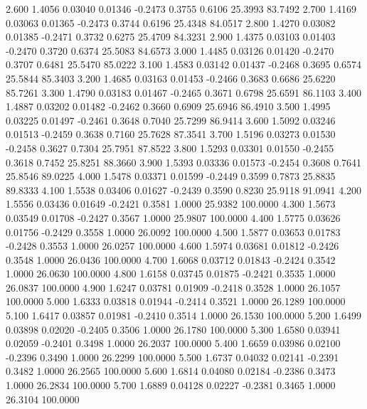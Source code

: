    2.600   1.4056   0.03040   0.01346  -0.2473   0.3755   0.6106  25.3993  83.7492
   2.700   1.4169   0.03063   0.01365  -0.2473   0.3744   0.6196  25.4348  84.0517
   2.800   1.4270   0.03082   0.01385  -0.2471   0.3732   0.6275  25.4709  84.3231
   2.900   1.4375   0.03103   0.01403  -0.2470   0.3720   0.6374  25.5083  84.6573
   3.000   1.4485   0.03126   0.01420  -0.2470   0.3707   0.6481  25.5470  85.0222
   3.100   1.4583   0.03142   0.01437  -0.2468   0.3695   0.6574  25.5844  85.3403
   3.200   1.4685   0.03163   0.01453  -0.2466   0.3683   0.6686  25.6220  85.7261
   3.300   1.4790   0.03183   0.01467  -0.2465   0.3671   0.6798  25.6591  86.1103
   3.400   1.4887   0.03202   0.01482  -0.2462   0.3660   0.6909  25.6946  86.4910
   3.500   1.4995   0.03225   0.01497  -0.2461   0.3648   0.7040  25.7299  86.9414
   3.600   1.5092   0.03246   0.01513  -0.2459   0.3638   0.7160  25.7628  87.3541
   3.700   1.5196   0.03273   0.01530  -0.2458   0.3627   0.7304  25.7951  87.8522
   3.800   1.5293   0.03301   0.01550  -0.2455   0.3618   0.7452  25.8251  88.3660
   3.900   1.5393   0.03336   0.01573  -0.2454   0.3608   0.7641  25.8546  89.0225
   4.000   1.5478   0.03371   0.01599  -0.2449   0.3599   0.7873  25.8835  89.8333
   4.100   1.5538   0.03406   0.01627  -0.2439   0.3590   0.8230  25.9118  91.0941
   4.200   1.5556   0.03436   0.01649  -0.2421   0.3581   1.0000  25.9382 100.0000
   4.300   1.5673   0.03549   0.01708  -0.2427   0.3567   1.0000  25.9807 100.0000
   4.400   1.5775   0.03626   0.01756  -0.2429   0.3558   1.0000  26.0092 100.0000
   4.500   1.5877   0.03653   0.01783  -0.2428   0.3553   1.0000  26.0257 100.0000
   4.600   1.5974   0.03681   0.01812  -0.2426   0.3548   1.0000  26.0436 100.0000
   4.700   1.6068   0.03712   0.01843  -0.2424   0.3542   1.0000  26.0630 100.0000
   4.800   1.6158   0.03745   0.01875  -0.2421   0.3535   1.0000  26.0837 100.0000
   4.900   1.6247   0.03781   0.01909  -0.2418   0.3528   1.0000  26.1057 100.0000
   5.000   1.6333   0.03818   0.01944  -0.2414   0.3521   1.0000  26.1289 100.0000
   5.100   1.6417   0.03857   0.01981  -0.2410   0.3514   1.0000  26.1530 100.0000
   5.200   1.6499   0.03898   0.02020  -0.2405   0.3506   1.0000  26.1780 100.0000
   5.300   1.6580   0.03941   0.02059  -0.2401   0.3498   1.0000  26.2037 100.0000
   5.400   1.6659   0.03986   0.02100  -0.2396   0.3490   1.0000  26.2299 100.0000
   5.500   1.6737   0.04032   0.02141  -0.2391   0.3482   1.0000  26.2565 100.0000
   5.600   1.6814   0.04080   0.02184  -0.2386   0.3473   1.0000  26.2834 100.0000
   5.700   1.6889   0.04128   0.02227  -0.2381   0.3465   1.0000  26.3104 100.0000
